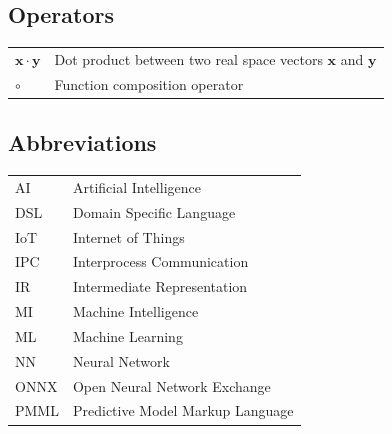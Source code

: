 \documentclass[english, 12pt, a4paper, elec, utf8, online]{aaltothesis}
\begin{document}
\subsection*{Operators}

\begin{tabular}{ll}
$\mathbf{x} \cdot \mathbf{y}$              & Dot product between two real space vectors $\mathbf{x}$ and $\mathbf{y}$\\
$\circ$ & Function composition operator  
\end{tabular}

\subsection*{Abbreviations}

\begin{tabular}{ll}
AI         & Artificial Intelligence \\   
DSL        & Domain Specific Language \\
IoT        & Internet of Things \\
IPC        & Interprocess Communication\\
IR         & Intermediate Representation \\ 
MI         & Machine Intelligence \\
ML         & Machine Learning \\
NN         & Neural Network \\
ONNX       & Open Neural Network Exchange \\
PMML       & Predictive Model Markup Language\\
\end{tabular}

\newpage

\thispagestyle{empty}
 
\listoffigures
 
\listoftables

\lstlistoflistings
 
\newpage

\cleardoublepage

\end{document}
